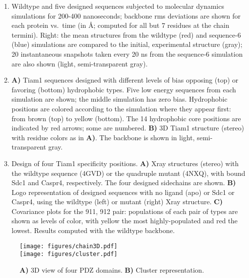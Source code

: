 \documentclass[12pt]{article}
\begin{document}
\begin{enumerate}
\item \label{fig:mdruns}
Wildtype and five designed sequences subjected to molecular dynamics simulations for 200-400 nanoseconds; backbone rms
deviations are shown for each protein vs.\ time (in \AA; computed for all but 7 residues at the chain termini). Right:
the mean structures from the wildtype (red) and sequence-6 (blue) simulations are compared to the initial, experimental 
structure (gray); 20 instantaneous snapshots taken every 20 ns from the sequence-6 simulation are also shown (light,
semi-transparent gray).

\item \label{fig:titrate}
{\bf A)} Tiam1 sequences designed with different levels of bias opposing (top) or favoring (bottom) hydrophobic types.
Five low energy sequences from each simulation are shown; the middle simulation has zero bias. Hydrophobic positions
are colored according to the simulation where they appear first: from brown (top) to yellow (bottom). The 14 hydrophobic
core positions are indicated by red arrows; some are numbered. {\bf B)} 3D Tiam1 structure (stereo) with residue colors
as in {\bf A)}. The backbone is shown in light, semi-transparent gray.

\item \label{fig:tiamQM} 
Design of four Tiam1 specificity positions. {\bf A)} Xray structures (stereo) with the wildtype sequence (4GVD) or the
quadruple mutant (4NXQ), with bound Sdc1 and Caspr4, respectively. The four designed sidechains are shown. {\bf B)} 
Logo representation of designed sequences with no ligand (apo) or Sdc1 or Caspr4, using the wildtype (left) or mutant (right)
Xray structure. {\bf C)} Covariance plots for the 911, 912 pair: populations of each pair of types are shown as levels of
color, with yellow the most highly-populated and red the lowest. Results computed with the wildtype backbone.

\end{enumerate}


\clearpage
\pagebreak

\begin{figure}[!h]
\begin{center}
\texttt{[image: figures/chain3D.pdf]} \\
\texttt{[image: figures/cluster.pdf]} 
\end{center}
\caption[width=1cm]{{\bf A)} 3D view of four PDZ domains. 
{\bf B)} Cluster representation.}
\end{figure}
\end{document}
